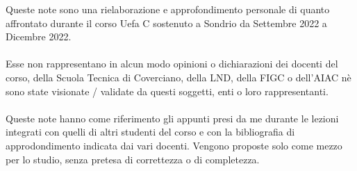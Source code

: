 Queste note sono una rielaborazione e approfondimento personale di quanto affrontato durante il corso Uefa C sostenuto a Sondrio da Settembre 2022 a Dicembre 2022. \hfill \\ \hfill \\
Esse non rappresentano in alcun modo opinioni o dichiarazioni dei docenti del corso, della Scuola Tecnica di Coverciano, della LND, della FIGC o dell'AIAC nè sono state visionate / validate da questi soggetti, enti o loro rappresentanti. \hfill \\ \hfill \\
Queste note hanno come riferimento gli appunti presi da me durante le lezioni integrati con quelli di altri studenti del corso e con la bibliografia di approdondimento indicata dai vari docenti. Vengono proposte solo come mezzo per lo studio, senza pretesa di correttezza o di completezza.